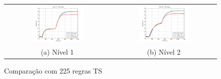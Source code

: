 \begin{figure}[H]
	\centering
	\begin{tabular}{cc}
		\includegraphics[width=0.5\textwidth,keepaspectratio]{img/h1_ts15_nm.png} &
		\includegraphics[width=0.5\textwidth,keepaspectratio]{img/h2_ts15_nm.png} \\
		(a) Nível 1 &
		(b) Nível 2
	\end{tabular}
	\caption{\label{imgTS15_nm} Comparação com 225 regras TS}
\end{figure}

